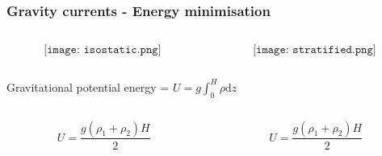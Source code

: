 \documentclass{beamer}
\begin{document}
\begin{frame}
  \frametitle{Gravity currents - Energy minimisation}

  \begin{columns}[t]

    \begin{column}{0.5\paperwidth}

      $$\texttt{[image: isostatic.png]}$$
      
    \end{column}

    \begin{column}{0.49\paperwidth}

      $$\texttt{[image: stratified.png]}$$
      
    \end{column}

  \end{columns}

  Gravitational potential energy = $U = g \int_{0}^{H} \rho \mathrm{d} z$

  \begin{columns}[t]

    \begin{column}{0.5\paperwidth}

      $$ U = \frac{g (\rho_{1} + \rho_{2}) H}{2} $$
      
    \end{column}

    \begin{column}{0.49\paperwidth}

      $$ U = \frac{g (\rho_{1} + \rho_{2}) H}{2} $$
      
      
    \end{column}

  \end{columns}
  
\end{frame}
\end{document}
